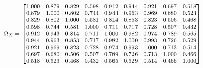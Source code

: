\documentclass{article}
\begin{document}
	\begin{equation*}
		\begin{medsize}
\Omega_X = %
\begin{bmatrix}{}
  1.000 & 0.879 & 0.829 & 0.598 & 0.912 & 0.944 & 0.921 & 0.697 & 0.518 \\ 
  0.879 & 1.000 & 0.802 & 0.744 & 0.943 & 0.963 & 0.969 & 0.680 & 0.523 \\ 
  0.829 & 0.802 & 1.000 & 0.581 & 0.814 & 0.853 & 0.823 & 0.506 & 0.468 \\ 
  0.598 & 0.744 & 0.581 & 1.000 & 0.711 & 0.717 & 0.728 & 0.507 & 0.432 \\ 
  0.912 & 0.943 & 0.814 & 0.711 & 1.000 & 0.982 & 0.974 & 0.789 & 0.565 \\ 
  0.944 & 0.963 & 0.853 & 0.717 & 0.982 & 1.000 & 0.993 & 0.726 & 0.529 \\ 
  0.921 & 0.969 & 0.823 & 0.728 & 0.974 & 0.993 & 1.000 & 0.713 & 0.514 \\ 
  0.697 & 0.680 & 0.506 & 0.507 & 0.789 & 0.726 & 0.713 & 1.000 & 0.466 \\ 
  0.518 & 0.523 & 0.468 & 0.432 & 0.565 & 0.529 & 0.514 & 0.466 & 1.000 \\ 
  \end{bmatrix}
\end{medsize}
\end{equation*}
\end{document}
